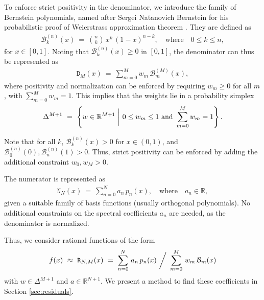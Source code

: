 \documentclass{article}
\newcommand{\NN}{{\mathtt N}}
\newcommand{\DD}{{\mathtt D}}
\newcommand{\RR}{{\mathtt R}}
\begin{document}
To enforce strict positivity in the denominator, we introduce the family of Bernstein polynomials, named after Sergei Natanovich Bernstein for his probabilistic proof of Weierstrass approximation theorem \cite{weierstrass_theorem_proof}. They are defined as 
\begin{eqnarray}
    \mathcal{B}^{(n)}_{k}(x)\ =\ \binom{n}{k}\, x^{k}\, (1-x)^{n - k},\quad \text{where}\quad 0\leq k\leq n,
\end{eqnarray}
for $x\in[0, 1]$. Noting that $\mathcal{B}_k^{(n)}(x)\geq 0$ in $[0, 1]$, the denominator can  thus be represented as 
\begin{eqnarray}
\DD_{M}(x) \ = \ \sum_{m=0}^{M} w_{m} \, \mathcal{B}_{m}^{(M)}(x),
\end{eqnarray}
where positivity and normalization can be enforced by requiring $w_m\geq 0$ for all $m$, with $\sum_{m=0}^Mw_m=1$. This implies that the weights lie in a probability simplex 
\begin{eqnarray}
\Delta^{M + 1} \ = \ \left\{ w\in\mathbb{R}^{M + 1}\ \bigg{|}\  0\leq w_{m} \leq 1 \ \text{and}\ \sum_{m=0}^{M} w_{m} = 1 \right\}.
\end{eqnarray}

{Note that for all $k$, $\mathcal{B}^{(n)}_k(x)>0$ for $x\in(0,1)$, and $\mathcal{B}^{(n)}_0(0),\mathcal{B}^{(n)}_n(1)>0$. Thus, strict positivity can be enforced by adding the additional constraint $w_0,w_M>0$.}

The numerator is represented as
\begin{eqnarray}
\NN_{N}(x) \ = \ \sum_{n=0}^{N}a_{n}\,  p_{n}(x), \quad \text{where} \quad a_{n} \in \mathbb{R},
\end{eqnarray}
given a suitable family of basis functions (usually orthogonal polynomials). 
No additional constraints on the spectral coefficients $a_n$ are needed, as the denominator is normalized.

Thus, we consider rational functions of the form
\begin{eqnarray}\label{eq:bernstein_rational_function}
    f(x)\ \approx\ \RR_{N,M}(x)\ =\ \sum_{n=0}^N\, a_n\, p_n(x)\ \bigg{/}\ \sum_{m=0}^M\, w_m\, \mathcal{B}_m(x)
\end{eqnarray}
with $w\in\Delta^{M+1}$ and $a\in\mathbb{R}^{N+1}$. We present a method to find these coefficients in Section \ref{sec:residuals}.
\end{document}
